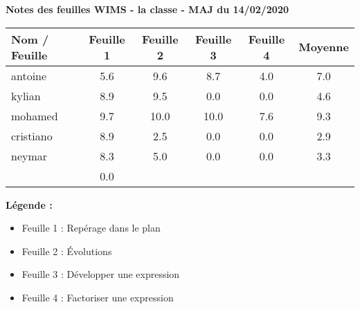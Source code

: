 \documentclass[12pt,a4paper]{article}
\begin{document}
\thispagestyle{empty}
\large
\begin{center}
\textbf{Notes des feuilles WIMS - la classe - MAJ du 14/02/2020}
\end{center}

\begin{center} 
\begin{tabular}{|l|*{5}{c|}} 
\hline 
\textbf{Nom / Feuille} & Feuille 1 & Feuille 2 & Feuille 3 & Feuille 4 & {\color{red} Moyenne } \\ 
\hline 
antoine & 5.6 & 9.6 & 8.7 & 4.0 & { \color{red} 7.0 } \\ 
\hline 
kylian & 8.9 & 9.5 & 0.0 & 0.0 & { \color{red} 4.6 } \\ 
\hline 
mohamed & 9.7 & 10.0 & 10.0 & 7.6 & { \color{red} 9.3 } \\ 
\hline 
cristiano & 8.9 & 2.5 & 0.0 & 0.0 & { \color{red} 2.9 } \\ 
\hline 
neymar & 8.3 & 5.0 & 0.0 & 0.0 & { \color{red} 3.3 } \\ 
\hline 
 & { \color{red} 0.0 } \\ 
\hline 
\end{tabular} 
\end{center} 
 
\textbf{{Légende : }} 
\begin{itemize} 
 \item Feuille 1 : Repérage dans le plan 
 \item Feuille 2 : Évolutions 
 \item Feuille 3 : Développer une expression 
 \item Feuille 4 : Factoriser une expression 
\end{itemize}
\end{document}
